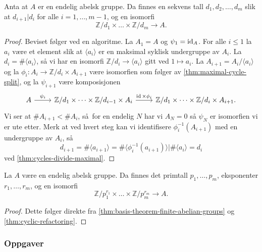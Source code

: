 \begin{theorem}
    \label{thm:basis-theorem-finite-abelian-groups}
    Anta at $A$ er en endelig abelsk gruppe.
    Da finnes en sekvens tall $d_1,d_2,\dots, d_m$ slik at
    $d_{i + 1} | d_i$ for alle $i = 1,\dots, m - 1$,
    og en isomorfi
    \[
        \mathbb Z / d_1\times\dots\times \mathbb Z / d_m
        \to A.
    \]
\end{theorem}
\begin{proof}
    Beviset følger ved en algoritme.
    La $A_1 = A$ og $\psi_1 = \operatorname{id}_A$.
    For alle $i\leq 1$ la $a_i$ være et element
    slik at $\langle a_i\rangle$ er en maksimal syklisk undergruppe av $A_i$.
    La $d_i = \#\langle a_i\rangle$, så vi har en isomorfi
    $\mathbb Z / d_i\to \langle a_i\rangle$ gitt ved $1\mapsto a_i$.
    La $A_{i + 1} = A_i / \langle a_i\rangle$
    og la $\phi_i\colon A_i\to \mathbb Z / d_i\times A_{i + 1}$ være isomorfien
    som følger av \cref{thm:maximal-cycle-split},
    og la $\psi_{i + 1}$ være komposisjonen
    \[\begin{tikzcd}
        A
        \rar{\psi_i}
        &
        \mathbb Z / d_1\times\dots\times \mathbb Z / d_{i - 1}\times A_i
        \rar{\id\times \phi_i}
        &
        \mathbb Z / d_1\times \dots \times \mathbb Z / d_i \times A_{i + 1}.
    \end{tikzcd}\]
    Vi ser at $\# A_{i + 1} < \# A_i$,
    så for en endelig $N$ har vi $A_N = 0$ så $\psi_N$ er isomorfien vi er ute etter.
    Merk at ved hvert steg kan vi identifisere $\phi_i^{-1}(A_{i + 1})$
    med en undergruppe av $A_i$,
    så
    \[
        d_{i + 1}
        = \#\langle a_{i + 1}\rangle
        = \#\langle \phi_i^{-1}(a_{i + 1})\rangle
        | \#\langle a_i\rangle
        = d_i
    \]
    ved \cref{thm:cycles-divide-maximal}.
\end{proof}

\begin{corollary}
    La $A$ være en endelig abelsk gruppe.
    Da finnes det primtall $p_1,\dots, p_m$,
    eksponenter $r_1,\dots,r_m$,
    og en isomorfi
    \[
        \mathbb Z / p_1^{r_1} \times \dots \times\mathbb Z / p_m^{r_m}
        \to A.
    \]
\end{corollary}
\begin{proof}
    Dette følger direkte fra \cref{thm:basis-theorem-finite-abelian-groups}
    og \cref{thm:cyclic-refactoring}.
\end{proof}

\subsubsection*{Oppgaver}

